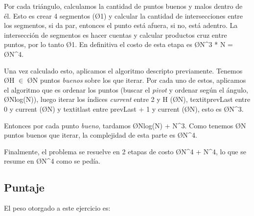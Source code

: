 Por cada triángulo, calculamos la cantidad de puntos buenos y malos dentro de él. Esto es crear 4 segmentos (\O{1}) y calcular la cantidad de intersecciones entre los segmentos, si da par, entonces el punto está afuera, si no, está adentro. La intersección de segmentos es hacer cuentas y calcular productos cruz entre puntos, por lo tanto \O{1}. En definitiva el costo de esta etapa es \O{N^3 * N} = \O{N^4}.

Una vez calculado esto, aplicamos el algoritmo descripto previamente. Tenemos \O{H} $\in$ \O{N} puntos \textit{buenos} sobre los que iterar. Por cada uno de estos, aplicamos el algoritmo que es ordenar los puntos (buscar el \textit{pivot} y ordenar según el ángulo, \O{Nlog(N)}), luego iterar los índices \textit{current} entre 2 y H (\O{N}), textit{prevLast} entre 0 y current (\O{N}) y textit{last} entre prevLast + 1 y current (\O{N}), esto es \O{N^3}.

Entonces por cada punto \textit{bueno}, tardamos \O{Nlog(N) + N^3}. Como tenemos \O{N} puntos buenos que iterar, la complejidad de esta parte es \O{N^4}.

Finalmente, el problema se resuelve en 2 etapas de costo \O{N^4 + N^4}, lo que se resume en \O{N^4} como se pedía.

\subsection{Puntaje}
El peso otorgado a este ejercicio es:
